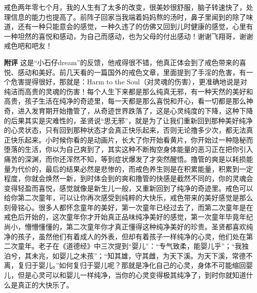\begin{case}
    戒色两年零七个月，我的人生有了太多的改变，很美妙很舒服，脑子转速快了，处理信息的能力也提高了。前阵子回家当我端着妈妈熬的汤时，鼻子里闻到的除了味道，还有一种只能意会的感觉，一种久违了的仿佛又回到儿时健康的感觉，心里有一种坦然的喜悦和感动，为自己而感动，也为父母的付出感动！谢谢飞翔哥，谢谢戒色吧和吧友！

    \textbf{附评} 这是“小石仔dream”的反馈，他戒得很不错，他真正体会到了戒色带来的喜悦、感动和美好。前几天看的一篇国外的戒色文章，里面提到了手淫的危害，有一个危害提得很好，那就是：Harm to the Soul（对灵魂的伤害），更准确地说是对纯洁而高贵的灵魂的伤害！每个人生下来都是那么纯真无邪，有一种天然的美好和高贵，孩子生活在纯净的奇迹里，每一天都是那么喜悦和开心，看一切都是那么神奇，进入发育期开始撸管了，从奇迹世界跌落了，这是心灵纯度的下降，这种下降的后果其实是灾难性的，圣贤说“思无邪”，就是为了让我们重新回到那种美好纯净的心灵状态，只有回到那种状态才会真正快乐起来，否则无论撸多少次，都无法真正快乐起来。小时候你看的是动画片，长大了你开始看黄片，你开始过一种隐秘而堕落的生活，你以为自己爽到了，其实这种不断掏空身体能量的恶习正在把你引入痛苦的深渊，而你还浑然不知，等到症状爆发了才突然醒悟。撸管的爽是以耗损能量为代价的，最后的结果必然是悲惨的，而戒色养生则是在积累能量，积累到一定程度，你就会焕然一新，到时体会到的爽和撸管的快感是截然不同的，你的灵魂会变得轻盈而喜悦，感觉就像是新生儿一般，又重新回到了纯净的奇迹里。戒色可以给你第二次童年，可以让你再次感受到纯粹的大快乐，戒色带来的美好感觉是那么刻骨铭心。很多人都怀念童年的美好，第一次童年已经过去了，而第二次童年是在戒色后开始的，这次童年你才开始真正品味纯净美好的感觉，第一次童年毕竟年纪尚小，懵懵懂懂的，第二次童年你才真正懂得这种纯净美好的珍贵。圣贤都喜欢纯净的孩子，虽然他们有着成人的外表，但却有着孩子一样纯净的心灵，他们处在第二次童年。老子在《道德经》中三次提到“婴儿”：“专气致柔，能婴儿乎”；“我独泊兮，其未兆，如婴儿之未孩”；“知其雄，守其雌，为天下溪。为天下溪，常德不离，复归于婴儿。”如何复归于婴儿呢？那就是净化自己的心灵，身体不可能缩回婴儿，但是心灵可以和婴儿一样纯净，当你的心灵变得极其纯净了，到时你就知道什么是真正的大快乐了。
\end{case}


